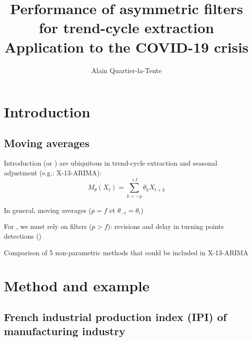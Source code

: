 \documentclass[10pt,xcolor=table,color={dvipsnames,usenames},ignorenonframetext,usepdftitle=false,english]{beamer}
\title{Performance of asymmetric filters for trend-cycle extraction\\
Application to the COVID-19 crisis}
\author{Alain Quartier-la-Tente}
\date{}
\newcommand\1{\mathds{1}}
\begin{document}
\begin{frame}
\titlepage
\end{frame}

\hypertarget{introduction}{%
\section{Introduction}\label{introduction}}

\hypertarget{moving-averages}{%
\subsection{Moving averages}\label{moving-averages}}

\begin{frame}{Introduction}
\protect\hypertarget{introduction-1}{}
 (or ) are
ubiquitous in trend-cycle extraction and seasonal adjustment (e.g.:
X-13-ARIMA): \[
M_\theta(X_t)=\sum_{k=-p}^{+f}\theta_kX_{t+k}
\]

\pause \bigskip

\faArrowCircleRight{} In general,  moving averages
(\(p=f\) et \(\theta_{-i}=\theta_i\))

\bigskip

\faArrowCircleRight{} For , we must
rely on  filters (\(p>f\)): revisions and delay in
turning points detections ()

\bigskip \pause

\faArrowCircleRight{} Comparison of 5 non-parametric methods that could
be included in X-13-ARIMA
\end{frame}

\hypertarget{method-and-example}{%
\section{Method and example}\label{method-and-example}}

\hypertarget{french-industrial-production-index-ipi-of-manufacturing-industry}{%
\subsection{French industrial production index (IPI) of manufacturing
industry}\label{french-industrial-production-index-ipi-of-manufacturing-industry}}
\end{document}
